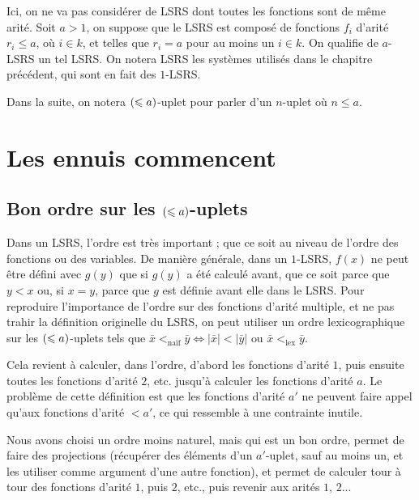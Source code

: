 	Ici, on ne va pas considérer de LSRS dont toutes les fonctions sont de même arité. Soit $a>1$, on suppose que le LSRS est composé de fonctions $f_i$ d'arité $r_i \leqslant a$, où $i \in k$, et telles que $r_i = a$ pour au moins un $i\in k$. On qualifie de $a$-LSRS un tel LSRS. On notera LSRS les systèmes utilisés dans le chapitre précédent, qui sont en fait des $1$-LSRS. 
	
	Dans la suite, on notera $\left( \leqslant a \right)$-uplet pour parler d'un $n$-uplet où $n\leqslant a$. 
	
	
	\section{Les ennuis commencent}
	\label{sec:ennuis_commencent}
	
		\subsection{Bon ordre sur les $\left( \leqslant a \right)$-uplets}
		\label{subsec:bon_ordre_uplets}
		
		Dans un LSRS, l'ordre est très important ; que ce soit au niveau de l'ordre des fonctions ou des variables. De manière générale, dans un $1$-LSRS, $f(x)$ ne peut être défini avec $g(y)$ que si $g(y)$ a été calculé avant, que ce soit parce que $y<x$ ou, si $x=y$, parce que $g$ est définie avant elle dans le LSRS. 
		Pour reproduire l'importance de l'ordre sur des fonctions d'arité multiple, et ne pas trahir la définition originelle du LSRS, on peut utiliser un ordre lexicographique sur les $\left( \leqslant a \right)$-uplets tels que $\bar{x} <_{\text{naïf}} \bar{y} \Leftrightarrow \left|\bar{x}\right| < \left|\bar{y}\right| \text{ ou } \bar{x} <_{\text{lex}} \bar{y}$. 
			
		Cela revient à calculer, dans l'ordre, d'abord les fonctions d'arité $1$, puis ensuite toutes les fonctions d'arité $2$, etc. jusqu'à calculer les fonctions d'arité $a$. Le problème de cette définition est que les fonctions d'arité $a'$ ne peuvent faire appel qu'aux fonctions d'arité $<a'$, ce qui ressemble à une contrainte inutile\footnotemark.
		
		
		Nous avons choisi un ordre moins naturel, mais qui est un bon ordre, permet de faire des projections (récupérer des éléments d'un $a'$-uplet, sauf au moins un, et les utiliser comme argument d'une autre fonction), et permet de calculer tour à tour des fonctions d'arité $1$, puis $2$, etc., puis revenir aux arités $1$, $2$...
		
